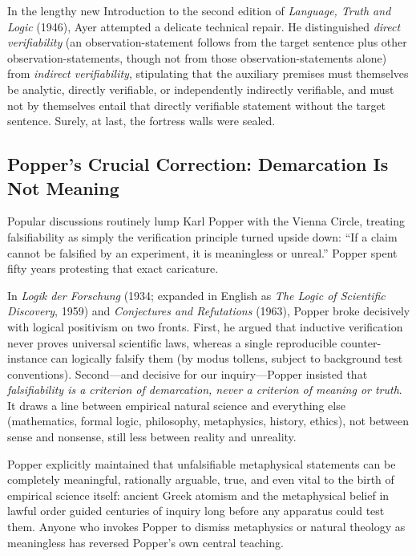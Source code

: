 In the lengthy new Introduction to the second edition of \emph{Language, Truth and Logic} (1946), Ayer attempted a delicate technical repair. He distinguished \emph{direct verifiability} (an observation-statement follows from the target sentence plus other observation-statements, though not from those observation-statements alone) from \emph{indirect verifiability}, stipulating that the auxiliary premises must themselves be analytic, directly verifiable, or independently indirectly verifiable, and must not by themselves entail that directly verifiable statement without the target sentence. Surely, at last, the fortress walls were sealed.

\subsection{Popper's Crucial Correction: Demarcation Is Not Meaning}

Popular discussions routinely lump Karl Popper with the Vienna Circle, treating falsifiability as simply the verification principle turned upside down: ``If a claim cannot be falsified by an experiment, it is meaningless or unreal.'' Popper spent fifty years protesting that exact caricature.

In \emph{Logik der Forschung} (1934; expanded in English as \emph{The Logic of Scientific Discovery}, 1959) and \emph{Conjectures and Refutations} (1963), Popper broke decisively with logical positivism on two fronts. First, he argued that inductive verification never proves universal scientific laws, whereas a single reproducible counter-instance can logically falsify them (by modus tollens, subject to background test conventions). Second---and decisive for our inquiry---Popper insisted that \emph{falsifiability is a criterion of demarcation, never a criterion of meaning or truth}. It draws a line between empirical natural science and everything else (mathematics, formal logic, philosophy, metaphysics, history, ethics), not between sense and nonsense, still less between reality and unreality.

Popper explicitly maintained that unfalsifiable metaphysical statements can be completely meaningful, rationally arguable, true, and even vital to the birth of empirical science itself: ancient Greek atomism and the metaphysical belief in lawful order guided centuries of inquiry long before any apparatus could test them. Anyone who invokes Popper to dismiss metaphysics or natural theology as meaningless has reversed Popper's own central teaching.

